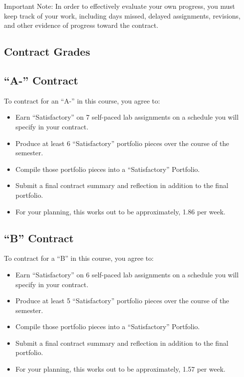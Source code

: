 \documentclass[
]{book}
\begin{document}
Important Note: In order to effectively evaluate your own progress, you must keep track of your work, including days missed, delayed assignments, revisions, and other evidence of progress toward the contract.

\subsection*{Contract Grades}\label{contract-grades}


\subsection*{``A-'' Contract}\label{a--contract}


To contract for an ``A-'' in this course, you agree to:

\begin{itemize}
\item
  Earn ``Satisfactory'' on 7 self-paced lab assignments on a schedule you will specify in your contract.
\item
  Produce at least 6 ``Satisfactory'' portfolio pieces over the course of the semester.
\item
  Compile those portfolio pieces into a ``Satisfactory'' Portfolio.
\item
  Submit a final contract summary and reflection in addition to the final portfolio.
\item
  For your planning, this works out to be approximately, 1.86 per week.
\end{itemize}

\subsection*{``B'' Contract}\label{b-contract}


To contract for a ``B'' in this course, you agree to:

\begin{itemize}
\item
  Earn ``Satisfactory'' on 6 self-paced lab assignments on a schedule you will specify in your contract.
\item
  Produce at least 5 ``Satisfactory'' portfolio pieces over the course of the semester.
\item
  Compile those portfolio pieces into a ``Satisfactory'' Portfolio.
\item
  Submit a final contract summary and reflection in addition to the final portfolio.
\item
  For your planning, this works out to be approximately, 1.57 per week.
\end{itemize}
\end{document}

